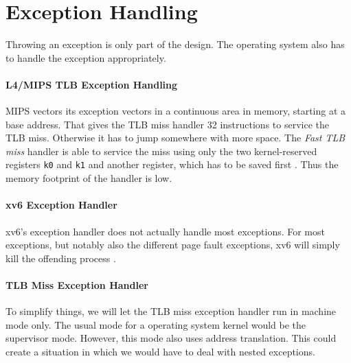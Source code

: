 
\section{Exception Handling}
Throwing an exception is only part of the design. The operating system also has to handle the exception appropriately.

\paragraph{L4/MIPS TLB Exception Handling}
MIPS vectors its exception vectors in a continuous area in memory, starting at a base address.
That gives the TLB miss handler 32 instructions to service the TLB miss. Otherwise it has to jump
somewhere with more space.
The \emph{Fast TLB miss} handler is able to service the miss using only the two kernel-reserved
registers \texttt{k0} and \texttt{k1} and another register, which has to be saved first \cite{heiserAnatomyHighPerformanceMicrokernel}.
Thus the memory footprint of the handler is low.

\paragraph{xv6 Exception Handler}
xv6's exception handler does not actually handle most exceptions. For most exceptions,
but notably also the different page fault exceptions, xv6 will simply kill the offending process \cite{cox2011xv6}.

\paragraph{TLB Miss Exception Handler}
To simplify things, we will let the TLB miss exception handler run in machine mode only.
The usual mode for a operating system kernel would be the supervisor mode. However, this
mode also uses address translation. This could create a situation in which we would have
to deal with nested exceptions.

